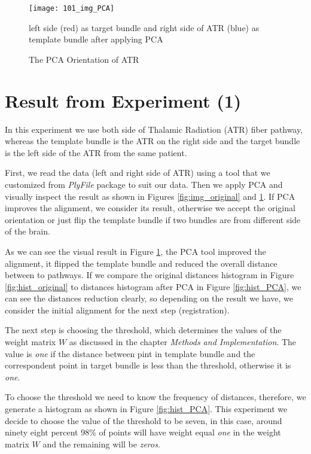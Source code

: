 \documentclass[../structure.tex]{subfiles}
\begin{document}
\begin{figure}[H]
\centering
\texttt{[image: 101\_img\_PCA]}
\captionsetup{justification=centering}
\caption{The PCA Orientation of ATR}%
{ left side (red) as target bundle and right side of ATR (blue) as template bundle after applying PCA}
\label{fig:img_PCA}
\end{figure}

\section{Result from Experiment (1)}
\hspace{2em}In this experiment we use both side of Thalamic Radiation (ATR) fiber pathway, whereas the template bundle is the ATR on the right side and the target bundle is the left side of the ATR from the same patient.

First, we read the data (left and right side of ATR) using a tool that we customized from \textit{PlyFile} package to suit our data. Then we apply PCA and visually inspect the result as shown in Figures \ref{fig:img_original} and \ref{fig:img_PCA}. If PCA improves the alignment, we consider its result, otherwise we accept the original orientation or just flip the template bundle if two bundles are from different side of the brain.

As we can see the visual result in Figure \ref{fig:img_PCA}, the PCA tool improved the alignment, it flipped the template bundle and reduced the overall distance between to pathways. If we compare the original distances histogram in Figure \ref{fig:hist_original} to distances histogram after PCA in Figure \ref{fig:hist_PCA}, we can see the distances reduction clearly, so depending on the result we have, we consider the initial alignment for the next step (registration).

The next step is choosing the threshold, which determines the values of the weight matrix $W$ as discussed in the chapter \textit{Methods and Implementation}. The value  is \textit{one} if the distance between pint in template bundle and the correspondent point in target bundle is less than the threshold, otherwise it is \textit{one}. 

To choose the threshold we need to know the frequency of distances, therefore, we generate a histogram as shown in Figure \ref{fig:hist_PCA}. This experiment we decide to choose the value of the threshold to be seven, in this case, around ninety eight percent 98\% of points will have weight equal \textit{one} in the weight matrix $W$ and the remaining will be \textit{zeros}.
\end{document}
